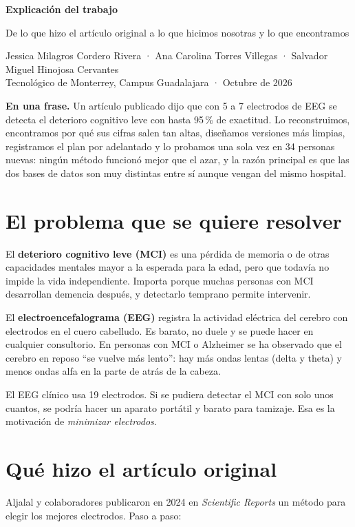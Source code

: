 \documentclass[11pt,letterpaper]{article}
\newcommand{\caja}[2]{\par\noindent\colorbox{#1!8}{\parbox{\dimexpr\linewidth-2\fboxsep}{#2}}\par}
\begin{document}
{\LARGE\bfseries Explicación del trabajo}\par\medskip
{\large De lo que hizo el artículo original a lo que hicimos nosotras y lo que encontramos}\par\medskip
Jessica Milagros Cordero Rivera · Ana Carolina Torres Villegas · Salvador Miguel Hinojosa Cervantes\\
Tecnológico de Monterrey, Campus Guadalajara · Octubre de 2026

\caja{azul}{\textbf{En una frase.} Un artículo publicado dijo que con 5 a 7 electrodos de EEG se detecta el deterioro cognitivo leve con hasta 95\,\% de exactitud. Lo reconstruimos, encontramos por qué sus cifras salen tan altas, diseñamos versiones más limpias, registramos el plan por adelantado y lo probamos una sola vez en 34 personas nuevas: ningún método funcionó mejor que el azar, y la razón principal es que las dos bases de datos son muy distintas entre sí aunque vengan del mismo hospital.}

\tableofcontents

\section{El problema que se quiere resolver}

El \textbf{deterioro cognitivo leve (MCI)} es una pérdida de memoria o de otras capacidades mentales mayor a la esperada para la edad, pero que todavía no impide la vida independiente. Importa porque muchas personas con MCI desarrollan demencia después, y detectarlo temprano permite intervenir.

El \textbf{electroencefalograma (EEG)} registra la actividad eléctrica del cerebro con electrodos en el cuero cabelludo. Es barato, no duele y se puede hacer en cualquier consultorio. En personas con MCI o Alzheimer se ha observado que el cerebro en reposo ``se vuelve más lento'': hay más ondas lentas (delta y theta) y menos ondas alfa en la parte de atrás de la cabeza.

El EEG clínico usa 19 electrodos. Si se pudiera detectar el MCI con solo unos cuantos, se podría hacer un aparato portátil y barato para tamizaje. Esa es la motivación de \emph{minimizar electrodos}.

\section{Qué hizo el artículo original}

Aljalal y colaboradores publicaron en 2024 en \emph{Scientific Reports} un método para elegir los mejores electrodos. Paso a paso:
\end{document}
